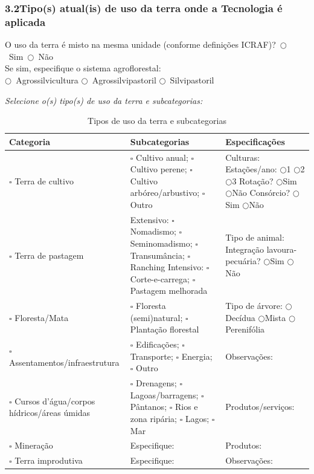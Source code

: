 \subsubsection*{3.2\quad Tipo(s) atual(is) de uso da terra onde a Tecnologia é aplicada}

O uso da terra é misto na mesma unidade (conforme definições ICRAF)?~$\bigcirc$~Sim~$\bigcirc$~Não\\
Se sim, especifique o sistema agroflorestal:\\
$\bigcirc$~Agrossilvicultura \quad $\bigcirc$~Agrossilvipastoril \quad $\bigcirc$~Silvipastoril

\medskip\noindent
\textit{Selecione o(s) tipo(s) de uso da terra e subcategorias:}

\begin{table}[htbp]
\centering\small
\caption{Tipos de uso da terra e subcategorias}
\label{tab:app_land_use}
\begin{tabular}{p{3.2cm}p{5.5cm}p{5.5cm}}
\toprule
\textbf{Categoria} & \textbf{Subcategorias} & \textbf{Especificações} \\
\midrule
$\square$ Terra de cultivo &
  $\square$ Cultivo anual;
  $\square$ Cultivo perene;
  $\square$ Cultivo arbóreo/arbustivo;
  $\square$ Outro &
  Culturas: \dotfill \newline
  Estações/ano: $\bigcirc$1 $\bigcirc$2 $\bigcirc$3 \newline
  Rotação? $\bigcirc$Sim $\bigcirc$Não \newline
  Consórcio? $\bigcirc$Sim $\bigcirc$Não \\
\addlinespace
$\square$ Terra de pastagem &
  Extensivo: $\square$ Nomadismo; $\square$ Seminomadismo; $\square$ Transumância; $\square$ Ranching \newline
  Intensivo: $\square$ Corte-e-carrega; $\square$ Pastagem melhorada &
  Tipo de animal: \dotfill \newline
  Integração lavoura-pecuária? $\bigcirc$Sim $\bigcirc$Não \\
\addlinespace
$\square$ Floresta/Mata &
  $\square$ Floresta (semi)natural; $\square$ Plantação florestal &
  Tipo de árvore: \dotfill \newline
  $\bigcirc$Decídua $\bigcirc$Mista $\bigcirc$Perenifólia \\
\addlinespace
$\square$ Assentamentos/infraestrutura &
  $\square$ Edificações; $\square$ Transporte; $\square$ Energia; $\square$ Outro &
  Observações: \dotfill \\
\addlinespace
$\square$ Cursos d'água/corpos hídricos/áreas úmidas &
  $\square$ Drenagens; $\square$ Lagoas/barragens; $\square$ Pântanos; $\square$ Rios e zona ripária; $\square$ Lagos; $\square$ Mar &
  Produtos/serviços: \dotfill \\
\addlinespace
$\square$ Mineração &
  Especifique: \dotfill &
  Produtos: \dotfill \\
\addlinespace
$\square$ Terra improdutiva &
  Especifique: \dotfill &
  Observações: \dotfill \\
\bottomrule
\end{tabular}
\end{table}

